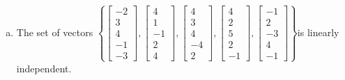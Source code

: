 \begin{exerciseAnswer}
\begin{enumerate}[(a)]
\item  The set of vectors \( \left\{ \left[\begin{array}{c}
-2 \\
3 \\
4 \\
-1 \\
-3
\end{array}\right] , \left[\begin{array}{c}
4 \\
1 \\
-1 \\
2 \\
4
\end{array}\right] , \left[\begin{array}{c}
4 \\
3 \\
4 \\
-4 \\
2
\end{array}\right] , \left[\begin{array}{c}
4 \\
2 \\
5 \\
2 \\
-1
\end{array}\right] , \left[\begin{array}{c}
-1 \\
2 \\
-3 \\
4 \\
-1
\end{array}\right] \right\} \)is linearly independent.
\end{enumerate}
    
\end{exerciseAnswer}
    
